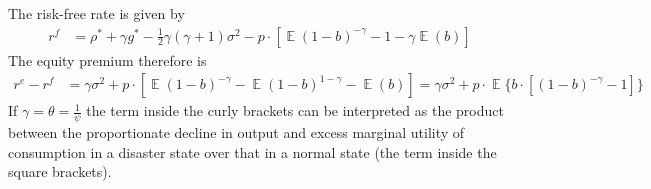 The risk-free rate is given by
\begin{align*}
    r^{f} &= \rho^{*} + \gamma g^{*} - \frac{1}{2} \gamma (\gamma+1) \sigma^{2} - p \cdot [\mathop{\mathbb{E}}(1-b)^{-\gamma}-1-\gamma \mathop{\mathbb{E}}(b)]
\end{align*}
The equity premium therefore is
\begin{align*}
    r^{e} - r^{f} &= \gamma \sigma^{2} + p \cdot [\mathop{\mathbb{E}}(1-b)^{-\gamma}-\mathop{\mathbb{E}}(1-b)^{1-\gamma}-\mathop{\mathbb{E}}(b)] = \gamma \sigma^{2} + p \cdot \mathop{\mathbb{E}} \{b \cdot [(1-b)^{-\gamma}-1]\}
\end{align*}
If $\gamma = \theta = \frac{1}{\psi}$ the term inside the curly brackets can be interpreted as the product between the proportionate decline in output and excess marginal utility of consumption in a disaster state over that in a normal state (the term inside the square brackets).
